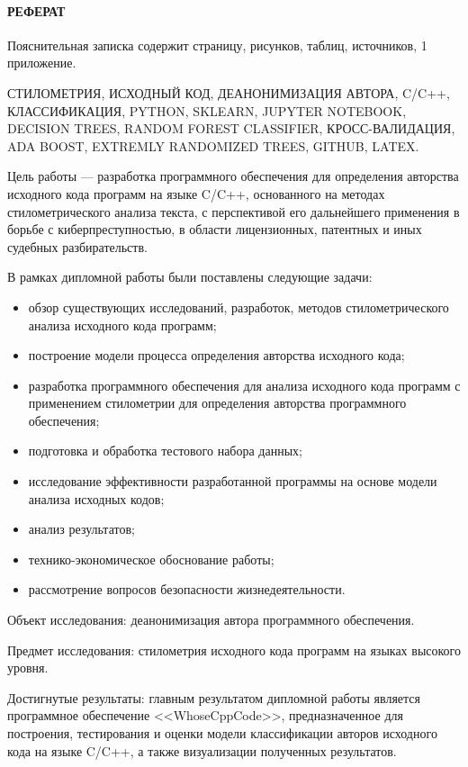 
\newpage
{}
\paragraph{\hfill РЕФЕРАТ \hfill}
Пояснительная записка содержит  страницу,  рисунков,  таблиц,  источников,
1 приложение.


СТИЛОМЕТРИЯ, ИСХОДНЫЙ КОД, ДЕАНОНИМИЗАЦИЯ АВТОРА, C/C++, КЛАССИФИКАЦИЯ, PYTHON, SKLEARN, JUPYTER NOTEBOOK, DECISION
TREES, RANDOM FOREST CLASSIFIER, КРОСС-ВАЛИДАЦИЯ, ADA BOOST, EXTREMLY RANDOMIZED TREES, GITHUB, LATEX.

Цель работы --- разработка программного обеспечения для определения авторства исходного кода программ
на языке C/C++, основанного на методах стилометрического анализа текста, с перспективой его
дальнейшего применения в борьбе с киберпреступностью, в области лицензионных, патентных и иных судебных разбирательств.

В рамках дипломной работы были поставлены следующие задачи: 
\begin{itemize}
  \item обзор существующих исследований, разработок, методов стилометрического анализа исходного кода программ;
\item построение модели процесса определения авторства исходного кода;
  \item разработка программного обеспечения для анализа исходного кода программ с применением стилометрии для
определения авторства программного обеспечения;
  \item подготовка и обработка тестового набора данных;
  \item исследование эффективности разработанной программы на основе модели анализа исходных кодов;
  \item анализ результатов;
  \item технико-экономическое обоснование работы;
  \item рассмотрение вопросов безопасности жизнедеятельности.
\end{itemize}

Объект исследования: деанонимизация автора программного обеспечения. 

Предмет исследования: стилометрия исходного кода программ на языках высокого уровня.

Достигнутые результаты: главным результатом дипломной работы является 
программное обеспечение <<WhoseCppCode>>, предназначенное для построения,
тестирования и оценки модели классификации авторов исходного кода на языке C/C++,
а также визуализации полученных результатов.

